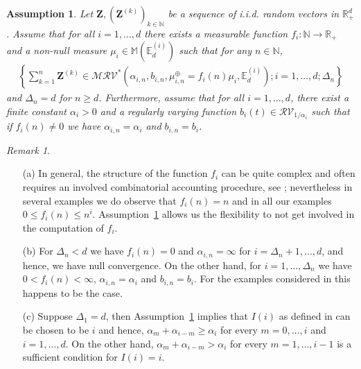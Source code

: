 \documentclass[aos]{imsart}
\numberwithin{equation}{section}
\theoremstyle{plain} %
\newtheorem{assumptionletter}{{{Assumption}}}
\theoremstyle{remark}
\newtheorem{definition}[theorem]{Definition}
\newtheorem{remark}[theorem]{Remark}
\newcommand{\beao}{\begin{eqnarray*}}
\newcommand{\eeao}{\end{eqnarray*}\noindent}
\newcommand{\E}{\mathbb{E}}
\newcommand{\N}{\mathbb{N}}
\newcommand{\R}{\mathbb{R}}
\def\MRV{\mathcal{MRV}}
\def\RV{\mathcal{RV}}
\def\bZ{\boldsymbol Z}
\begin{document}
\begin{assumptionletter} \label{AssumptionA}
Let $\bZ, (\bZ^{(k)})_{k\in\N}$ be a sequence of  i.i.d.  random vectors in $\R_+^d$. Assume that for all $i=1,\ldots,d$ there exists a measurable function $f_i:\N\to\R_+$ and {a non-null measure $\mu_i\in \mathbb{M}(\E_d^{(i)})$ 
  such that for any $n\in\N$, 
\beao
   \left\{\sum_{k=1}^n\bZ^{(k)}\in\MRV^*(\alpha_{i,n},b_{i,n},\mu_{i,n}^{\oplus}=f_i(n)\mu_i,\E_d^{(i)}); i=1,\ldots,d;\Delta_n\right\}
\eeao
and $\Delta_n=d$ for $n\ge d$. Furthermore, assume that for all $i=1, \ldots, d$, there exist a finite constant $\alpha_i>0$ and a regularly varying function $b_i(t)\in\RV_{1/\alpha_i}$ such that if $f_i(n)\not=0$ we have $\alpha_{i,n}=\alpha_i$ and $b_{i,n}=b_i$.} 
\end{assumptionletter}


\begin{remark} \label{Remark 1} $\mbox{}$
\begin{enumerate}
  \item[(a)]  In general, the structure of the function $f_i$ can be quite complex and often requires an involved combinatorial  accounting procedure, see  ; nevertheless  in
    several examples we do observe that $f_i(n)=n$ and in all our examples $0\leq f_i(n)\leq n^i$. Assumption~\ref{AssumptionA} allows us the flexibility to not get involved in the computation of $f_i$.
   \item[(b)]  For $\Delta_n<d$ we have $f_i(n)=0$ and $\alpha_{i,n}=\infty$ for $i=\Delta_n+1,\ldots,d$,  and hence, we have null convergence. 
 On the other hand, for $i=1,\ldots,\Delta_n$ we have $0<f_i(n)<\infty$, $\alpha_{i,n}=\alpha_i$ and $b_{i,n}=b_i$.  For the examples considered in  this happens to be the case.

    \item[(c)] Suppose $\Delta_1=d$, then Assumption~\ref{AssumptionA} implies that  $I(i)$ as defined
        in  can be chosen to be $i$  and hence, $\alpha_m+\alpha_{i-m}\geq \alpha_i$ for every $m=0,\ldots,i$ and $i=1,\ldots,d$.
On the other hand,  $\alpha_m+\alpha_{i-m}> \alpha_i$ for every $m=1,\ldots,i-1$  is a sufficient condition for  $I(i)=i$.
\end{enumerate}
\end{remark}
\end{document}
